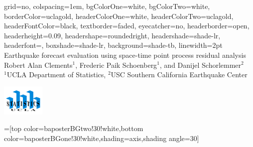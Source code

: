 \documentclass[landscape,a0paper,final,showframe]{baposter}
\begin{document}
\begin{poster}{
  grid=no,
  colspacing=1em,
  bgColorOne=white,
  bgColorTwo=white,
  borderColor=uclagold,
  headerColorOne=white,
  headerColorTwo=uclagold,
  headerFontColor=black,
  textborder=faded,
  eyecatcher=no,
  headerborder=open,
  headerheight=0.09\textheight,
  headershape=roundedright,
  headershade=shade-lr,
  headerfont=\Large\textsf, %
  boxshade=shade-lr,
  background=shade-tb,
  linewidth=2pt
  }
  {} %
  {\textnormal{\sf%
 Earthquake forecast evaluation using space-time point process residual analysis}}
  {\sf %
  Robert Alan Clements$^1$, Frederic Paik Schoenberg$^1$, and Danijel Schorlemmer$^2$\hspace{3em} \\
  {\footnotesize $^1$UCLA Department of Statistics, $^2$USC Southern California Earthquake Center}
  }
  {{\begin{minipage}{5em}
    \hfill
    \includegraphics[height=4em]{ucla}
  \end{minipage}}
  }

  =[top color=baposterBGtwo!30!white,bottom color=baposterBGone!30!white,shading=axis,shading angle=30]

     \newlength{\leftimgwidth}
     \setlength{\leftimgwidth}{0.78em+8.0em}


\end{poster}
\end{document}
